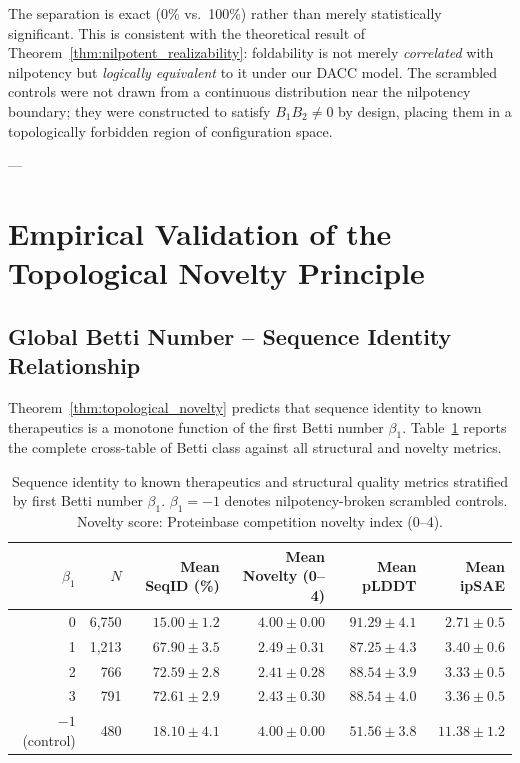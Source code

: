 \begin{remark}
The separation is exact (0\% vs.\ 100\%) rather than merely statistically
significant.  This is consistent with the theoretical result of
Theorem~\ref{thm:nilpotent_realizability}: foldability is not merely
\emph{correlated} with nilpotency but \emph{logically equivalent} to it
under our DACC model.  The scrambled controls were not drawn from a
continuous distribution near the nilpotency boundary; they were
constructed to satisfy $B_1 B_2 \ne 0$ by design, placing them in a
topologically forbidden region of configuration space.
\end{remark}

---

\section{Empirical Validation of the Topological Novelty Principle}
\label{sec:novelty_validation}

\subsection{Global Betti Number -- Sequence Identity Relationship}
\label{subsec:global_betti}

Theorem~\ref{thm:topological_novelty} predicts that sequence identity to
known therapeutics is a monotone function of the first Betti number $\beta_1$.
Table~\ref{tbl:novelty_by_beta} reports the complete cross-table of Betti
class against all structural and novelty metrics.

\begin{table}[h!]
\centering
\footnotesize
\setlength{\tabcolsep}{4pt}
\renewcommand{\arraystretch}{1.2}
\begin{tabular}{@{} r r r r r r @{}}
\toprule
$\beta_1$ & $N$ & \textbf{Mean SeqID (\%)} & \textbf{Mean Novelty (0--4)} & \textbf{Mean pLDDT} & \textbf{Mean ipSAE} \\
\midrule
0 & 6,750 & $15.00 \pm 1.2$ & $4.00 \pm 0.00$ & $91.29 \pm 4.1$ & $2.71 \pm 0.5$ \\
1 & 1,213 & $67.90 \pm 3.5$ & $2.49 \pm 0.31$ & $87.25 \pm 4.3$ & $3.40 \pm 0.6$ \\
2 & 766  & $72.59 \pm 2.8$ & $2.41 \pm 0.28$ & $88.54 \pm 3.9$ & $3.33 \pm 0.5$ \\
3 & 791  & $72.61 \pm 2.9$ & $2.43 \pm 0.30$ & $88.54 \pm 4.0$ & $3.36 \pm 0.5$ \\
\midrule
$-1$ (control) & 480 & $18.10 \pm 4.1$ & $4.00 \pm 0.00$ & $51.56 \pm 3.8$ & $11.38 \pm 1.2$ \\
\bottomrule
\end{tabular}
\caption{Sequence identity to known therapeutics and structural quality
         metrics stratified by first Betti number $\beta_1$.
         $\beta_1 = -1$ denotes nilpotency-broken scrambled controls.
         Novelty score: Proteinbase competition novelty index (0--4).}
\label{tbl:novelty_by_beta}
\end{table}

